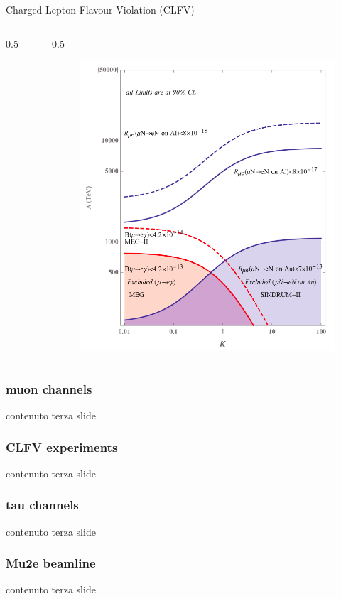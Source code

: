 \documentclass{beamer}
\begin{document}
\begin{frame}{Charged Lepton Flavour Violation (CLFV)}
\begin{columns}
\begin{column}{0.5\framewidth}
\begin{figure}[h]
        \end{figure}  
    \end{column}
    \begin{column}{0.5\framewidth}
        \begin{figure}[h]
            \centering
            \hspace*{-6ex}
            \includegraphics[width=0.85\columnwidth]{figures/png/Screenshot_20240313_120457.png}
        \end{figure}  
    \end{column}
\end{columns}

\end{frame}

\begin{frame}
    \frametitle{muon channels}
    contenuto terza slide
\end{frame}

\begin{frame}
    \frametitle{CLFV experiments}
    contenuto terza slide
\end{frame}
\begin{frame}
    \frametitle{tau channels}
    contenuto terza slide
\end{frame}

\begin{frame}
    \frametitle{Mu2e beamline}
    contenuto terza slide
\end{frame}
\end{document}
